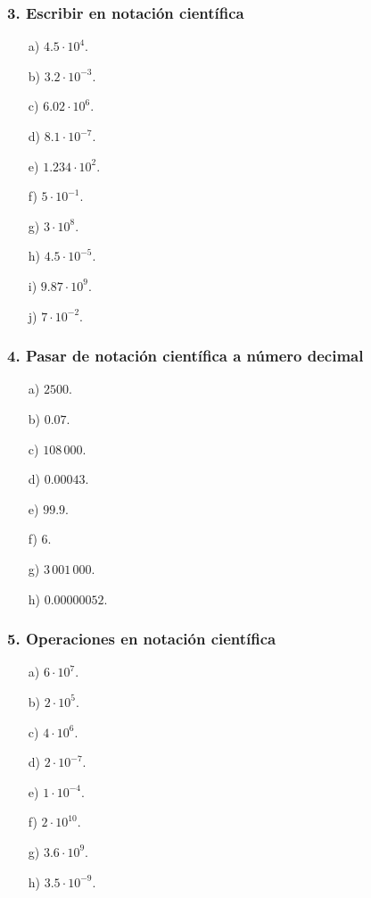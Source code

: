 \subsubsection*{3. Escribir en notación científica}
\begin{enumerate}
    \item[a)] $4.5\cdot10^4$.
    \item[b)] $3.2\cdot10^{-3}$.
    \item[c)] $6.02\cdot10^6$.
    \item[d)] $8.1\cdot10^{-7}$.
    \item[e)] $1.234\cdot10^2$.
    \item[f)] $5\cdot10^{-1}$.
    \item[g)] $3\cdot10^8$.
    \item[h)] $4.5\cdot10^{-5}$.
    \item[i)] $9.87\cdot10^9$.
    \item[j)] $7\cdot10^{-2}$.
\end{enumerate}

\subsubsection*{4. Pasar de notación científica a número decimal}
\begin{enumerate}
    \item[a)] $2500$.
    \item[b)] $0.07$.
    \item[c)] $108\,000$.
    \item[d)] $0.00043$.
    \item[e)] $99.9$.
    \item[f)] $6$.
    \item[g)] $3\,001\,000$.
    \item[h)] $0.00000052$.
\end{enumerate}

\subsubsection*{5. Operaciones en notación científica}
\begin{enumerate}
    \item[a)] $6\cdot10^7$.
    \item[b)] $2\cdot10^5$.
    \item[c)] $4\cdot10^6$.
    \item[d)] $2\cdot10^{-7}$.
    \item[e)] $1\cdot10^{-4}$.
    \item[f)] $2\cdot10^{10}$.
    \item[g)] $3.6\cdot10^9$.
    \item[h)] $3.5\cdot10^{-9}$.
\end{enumerate}


